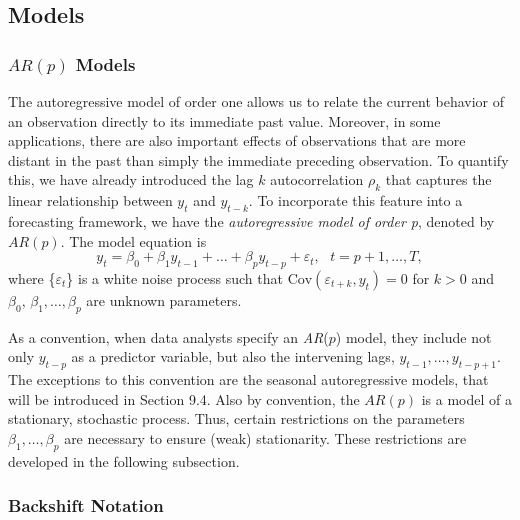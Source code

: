 \subsection{Models}

\subsubsection*{$AR(p)$ Models}


The autoregressive model of order one allows us to relate the
current behavior of an observation directly to its immediate past
value. Moreover, in some applications, there are also important
effects of observations that are more distant in the past than
simply the immediate preceding observation. To quantify this, we
have already introduced the lag $k$ autocorrelation $\rho_k$ that
captures the linear relationship between $y_t$ and $y_{t-k}$. To
incorporate this feature into a forecasting framework, we have the
\emph{autoregressive model of order p}, denoted by $AR(p).$ The
model equation is
\begin{equation} \label{E8:ARp}
y_t = \beta_0 + \beta_1 y_{t-1} + \ldots + \beta_p y_{t-p} +
\varepsilon_t, \text{ \ \ \ \ \ \ \ \ }t=p+1,\ldots ,T,
\end{equation}
where \{$\varepsilon_t$\} is a white noise process such that
$\mathrm{Cov}(\varepsilon_{t+k}, y_t)=0$ for $k>0$ and $\beta_0$,
$\beta_1,\ldots,\beta_p$ are unknown parameters.

As a convention, when data analysts specify an \textit{AR}($p$)
model, they include not only $y_{t-p}$ as a predictor variable, but
also the intervening lags, $y_{t-1}, \ldots, y_{t-p+1}$. The
exceptions to this convention are the seasonal autoregressive
models, that will be introduced in Section 9.4. Also by convention,
the $AR(p)$ is a model of a stationary, stochastic process. Thus,
certain restrictions on the parameters $\beta_1, \ldots, \beta_p$
are necessary to ensure (weak) stationarity. These restrictions are
developed in the following subsection.

\subsubsection*{Backshift Notation}

